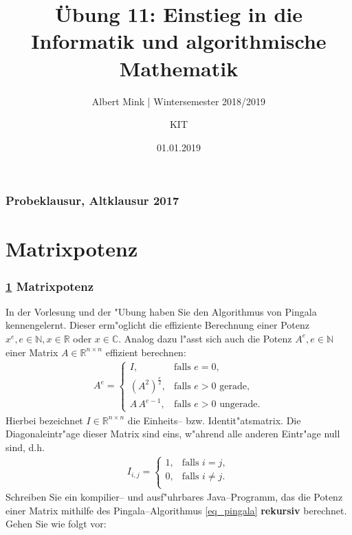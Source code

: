 \documentclass[c,18pt]{beamer}
\date{01.01.2019}
\title[Übung 11: Einstieg in die Informatik und algorithmische Mathematik]
  {Übung 11: Einstieg in die Informatik und algorithmische Mathematik}
\subtitle{Albert Mink | Wintersemester 2018/2019}
\author[Albert Mink, ]{KIT}
\institute[Institut für Angewandte und Numerische Mathematik (IANM)]{Institut für Angewandte und Numerische Mathematik}
\begin{document}
\begin{frame}
  \maketitle
\end{frame}

\begin{frame}
  \frametitle{Probeklausur, Altklausur 2017}%
\tableofcontents
\end{frame}

\def\stitle{Matrixpotenz}
\section{\stitle}\label{S:matrix}
\begin{frame}[t]%
  \frametitle{\ref{S:matrix} \stitle}
In der Vorlesung und der "Ubung haben Sie den Algorithmus von Pingala kennengelernt. Dieser erm"oglicht die
effiziente Berechnung einer Potenz $x^e, e\in\mathbb N, x\in\mathbb R$ oder $x\in\mathbb C$. Analog dazu
l"asst sich auch die Potenz $A^e, e\in\mathbb N$ einer Matrix $A\in\mathbb R^{n \times n}$ effizient
berechnen:
\begin{align}
 \label{eq_pingala}
 A^e =
  \begin{cases}
   I, & \text{falls } e=0,\\
   (A^2)^{\frac{e}{2}}, & \text{falls $e>0$ gerade},\\
   A\,A^{e-1}, & \text{falls $e>0$ ungerade}.
  \end{cases}
\end{align}
Hierbei bezeichnet $I\in\mathbb R^{n \times n}$ die Einheits-- bzw. Identit"atsmatrix. Die Diagonaleintr"age dieser
Matrix sind eins, w"ahrend alle anderen Eintr"age null sind, d.h.
\begin{align*}
 I_{i,j} =
 \begin{cases}
   1, &\text{falls } i=j,\\
   0, &\text{falls } i\neq j.\\
 \end{cases}
\end{align*}
Schreiben Sie ein kompilier-- und ausf"uhrbares Java--Programm, das die Potenz einer Matrix mithilfe des
Pingala--Algorithmus \eqref{eq_pingala} \textbf{rekursiv} berechnet. Gehen Sie wie folgt vor:\\[1em]

\end{frame}
\end{document}
